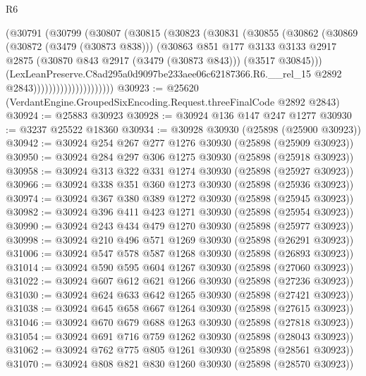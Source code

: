 \begin{lexlean}{R6}
\begin{coremodule}
                            (@30791
                              (@30799
                                (@30807
                                  (@30815
                                    (@30823
                                      (@30831
                                        (@30855
                                          (@30862
                                            (@30869
                                              (@30872 (@3479 (@30873 @838)))
                                              (@30863
                                                @851
                                                @177
                                                @3133
                                                @3133
                                                @2917
                                                @2875
                                                (@30870 @843 @2917 (@3479 (@30873 @843)))
                                                (@3517 @30845)))
                                            (LexLeanPreserve.C8ad295a0d9097be233aee06c62187366.R6.__rel_15
                                              @2892
                                              @2843)))))))))))))))))))))
@30923 := @25620 (VerdantEngine.GroupedSixEncoding.Request.threeFinalCode @2892 @2843)
@30924 := @25883 @30923
@30928 := @30924 @136 @147 @247 @1277
@30930 := @3237 @25522 @18360
@30934 := @30928 @30930 (@25898 (@25900 @30923))
@30942 := @30924 @254 @267 @277 @1276 @30930 (@25898 (@25909 @30923))
@30950 := @30924 @284 @297 @306 @1275 @30930 (@25898 (@25918 @30923))
@30958 := @30924 @313 @322 @331 @1274 @30930 (@25898 (@25927 @30923))
@30966 := @30924 @338 @351 @360 @1273 @30930 (@25898 (@25936 @30923))
@30974 := @30924 @367 @380 @389 @1272 @30930 (@25898 (@25945 @30923))
@30982 := @30924 @396 @411 @423 @1271 @30930 (@25898 (@25954 @30923))
@30990 := @30924 @243 @434 @479 @1270 @30930 (@25898 (@25977 @30923))
@30998 := @30924 @210 @496 @571 @1269 @30930 (@25898 (@26291 @30923))
@31006 := @30924 @547 @578 @587 @1268 @30930 (@25898 (@26893 @30923))
@31014 := @30924 @590 @595 @604 @1267 @30930 (@25898 (@27060 @30923))
@31022 := @30924 @607 @612 @621 @1266 @30930 (@25898 (@27236 @30923))
@31030 := @30924 @624 @633 @642 @1265 @30930 (@25898 (@27421 @30923))
@31038 := @30924 @645 @658 @667 @1264 @30930 (@25898 (@27615 @30923))
@31046 := @30924 @670 @679 @688 @1263 @30930 (@25898 (@27818 @30923))
@31054 := @30924 @691 @716 @759 @1262 @30930 (@25898 (@28043 @30923))
@31062 := @30924 @762 @775 @805 @1261 @30930 (@25898 (@28561 @30923))
@31070 := @30924 @808 @821 @830 @1260 @30930 (@25898 (@28570 @30923))

\end{coremodule}
\end{lexlean}
